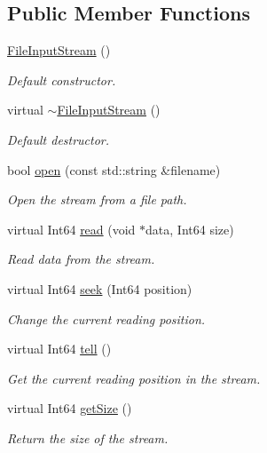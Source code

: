 \subsection*{Public Member Functions}
\begin{DoxyCompactItemize}
\item 
\mbox{\hyperlink{classsf_1_1_file_input_stream_a9a321e273f41ff7f187899061fcae9be}{File\+Input\+Stream}} ()
\begin{DoxyCompactList}\small\item\em Default constructor. \end{DoxyCompactList}\item 
virtual \mbox{\hyperlink{classsf_1_1_file_input_stream_ad49ae2025ff2183f80067943a7d0276d}{$\sim$\+File\+Input\+Stream}} ()
\begin{DoxyCompactList}\small\item\em Default destructor. \end{DoxyCompactList}\item 
bool \mbox{\hyperlink{classsf_1_1_file_input_stream_a87a95dc3a71746097a99c86ee58bb353}{open}} (const std\+::string \&filename)
\begin{DoxyCompactList}\small\item\em Open the stream from a file path. \end{DoxyCompactList}\item 
virtual Int64 \mbox{\hyperlink{classsf_1_1_file_input_stream_ad1e94c4152429f485db224c44ee1eb50}{read}} (void $\ast$data, Int64 size)
\begin{DoxyCompactList}\small\item\em Read data from the stream. \end{DoxyCompactList}\item 
virtual Int64 \mbox{\hyperlink{classsf_1_1_file_input_stream_abdaf5700d4e1de07568e7829106b4eb9}{seek}} (Int64 position)
\begin{DoxyCompactList}\small\item\em Change the current reading position. \end{DoxyCompactList}\item 
virtual Int64 \mbox{\hyperlink{classsf_1_1_file_input_stream_a768c5fdb3be79e2d71d1bce911f8741c}{tell}} ()
\begin{DoxyCompactList}\small\item\em Get the current reading position in the stream. \end{DoxyCompactList}\item 
virtual Int64 \mbox{\hyperlink{classsf_1_1_file_input_stream_aabdcaa315e088e008eeb9711ecc796e8}{get\+Size}} ()
\begin{DoxyCompactList}\small\item\em Return the size of the stream. \end{DoxyCompactList}\end{DoxyCompactItemize}
